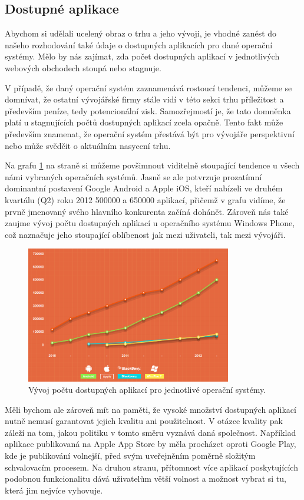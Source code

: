 \documentclass[thesis=M,czech]{FITthesis}[2012/06/26]
\begin{document}
\subsection{Dostupné aplikace}
Abychom si udělali ucelený obraz o trhu a jeho vývoji, je vhodné zanést do našeho rozhodování také údaje o dostupných aplikacích pro dané operační systémy. Mělo by nás zajímat, zda počet dostupných aplikací v jednotlivých webových obchodech stoupá nebo stagnuje.

V případě, že daný operační systém zaznamenává rostoucí tendenci, můžeme se domnívat, že ostatní vývojářské firmy stále vidí v této sekci trhu příležitost a především peníze, tedy potencionální zisk. Samozřejmostí je, že tato domněnka platí u stagnujících počtů dostupných aplikací zcela opačně. Tento fakt může především znamenat, že operační systém přestává být pro vývojáře perspektivní nebo může svědčit o aktuálním nasycení trhu.

Na grafu \ref{fig:apps} na straně \pageref{fig:apps} si můžeme povšimnout viditelně stoupající tendence u všech námi vybraných operačních systémů. Jasně se ale potvrzuje prozatímní dominantní postavení Google Android a Apple iOS, kteří nabízeli ve druhém kvartálu (Q2) roku 2012 500000 a 650000 aplikací, přičemž v grafu vidíme, že prvně jmenovaný svého hlavního konkurenta začíná dohánět. Zároveň nás také zaujme vývoj počtu dostupných aplikací u operačního systému Windows Phone, což naznačuje jeho stoupající oblíbenost jak mezi uživateli, tak mezi vývojáři.

\begin{figure}\centering
	\includegraphics[width=0.8\textwidth]{figures/apps_available}
	\caption{Vývoj počtu dostupných aplikací pro jednotlivé operační systémy.\cite{mobile_stats}}
	\label{fig:apps}
\end{figure}

Měli bychom ale zároveň mít na paměti, že vysoké množství dostupných aplikací nutně nemusí garantovat jejich kvalitu ani použitelnost. V otázce kvality pak záleží na tom, jakou politiku v tomto směru vyznává daná společnost. Například aplikace publikovaná na Apple App Store by měla procházet oproti Google Play, kde je publikování volnejší, před svým uveřejněním poměrně složitým schvalovacím procesem. Na druhou stranu, přítomnost více aplikací poskytujících podobnou funkcionalitu dává uživatelům větší volnost a možnost vybrat si tu, která jim nejvíce vyhovuje.
\end{document}
